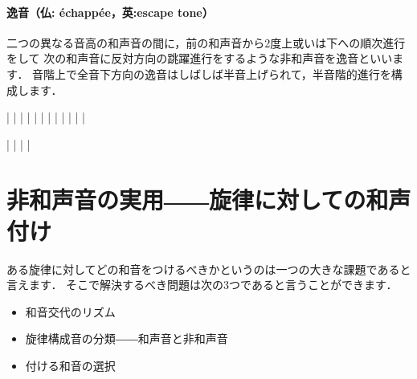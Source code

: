 \documentclass[dvipdfmx,uplatex,b5paper,openany,jbase=12Q,nomag*,textwidth-limit=44%
               ]{gachimuchi}
\begin{document}
\paragraph{逸音（仏: échappée，英:escape tone）}
二つの異なる音高の和声音の間に，前の和声音から2度上或いは下への順次進行をして
次の和声音に反対方向の跳躍進行をするような非和声音を逸音といいます．
音階上で全音下方向の逸音はしばしば半音上げられて，半音階的進行を構成します．
\begin{Music}
  \generalmeter{\meterC}%
  \Startpiece%
  \NOtes%
  |\zchordsu{\Cross}%
  \en\NOTes%
  |%
  \en\doublebar%
  \NOtes%
  |\zchordsu{\Cross}%
  \en\NOTes%
  |%
  \en\doublebar%
  \NOtes%
  |\zchordsu{\Cross}%
  \en\NOTes%
  |%
  \en\doublebar%
  \NOtes%
  |\zchordsu{\Cross}%
  \en\NOTes%
  |%
  \en\doublebar%
  \NOtes%
  |\zchordsu{\Cross}%
  \en\NOTes%
  |%
  \en\doublebar%
  \NOtes%
  |\zchordsu{\Cross}%
  \en\NOTes%
  |%
  \en\setdoublebar%
  \endpiece%
\end{Music}

\begin{Music}[.6\linewidth]
  \generalmeter{\meterC}%
  \Startpiece%
  \NOtes%
  |%
  \en\NOTes%
  |%
  \en\doublebar%
  \NOtes%
  |%
  \en\NOTes%
  |%
  \en\setdoublebar%
  \endpiece%
\end{Music}

\section{非和声音の実用――旋律に対しての和声付け}
ある旋律に対してどの和音をつけるべきかというのは一つの大きな課題であると言えます．
そこで解決するべき問題は次の3つであると言うことができます．
\begin{itemize}
  \item 和音交代のリズム
  \item 旋律構成音の分類――和声音と非和声音
  \item 付ける和音の選択
\end{itemize}
\end{document}
